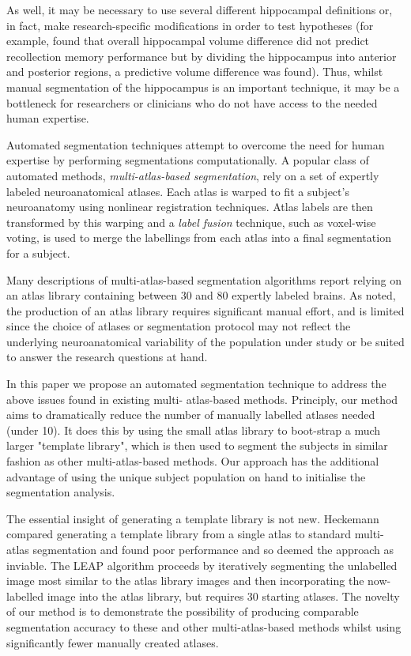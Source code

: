 \documentclass{article}
\begin{document}
As well, it may be necessary to use several different hippocampal
definitions or, in fact, make research-specific modifications in order to test
hypotheses (for example, \cite{Poppenk2011} found that overall hippocampal
volume difference did not predict recollection memory performance but by
dividing the hippocampus into anterior and posterior regions, a predictive
volume difference was found).  Thus, whilst manual segmentation of the
hippocampus is an important technique, it may be a bottleneck for researchers
or clinicians who do not have access to the needed human expertise.

Automated segmentation techniques attempt to overcome the need for human
expertise by performing segmentations computationally.  A popular class of
automated methods, {\it multi-atlas-based segmentation}, rely on a set of
expertly labeled neuroanatomical atlases. Each atlas is warped to fit a
subject's neuroanatomy using nonlinear registration
techniques\cite{Collins1995,Klein2009}.  Atlas labels are then transformed
by this warping and a {\it label fusion} technique, such as voxel-wise
voting, is used to merge the labellings from each atlas into a final
segmentation for a subject.  

Many descriptions of multi-atlas-based segmentation algorithms report relying on an
atlas library containing between 30 and 80 expertly labeled
brains\cite{Heckemann2011,Collins2010,Aljabar2009,Leung2010,Lotjonen2010}.
As noted, the production of an atlas library requires significant manual
effort, and is limited since the choice of atlases or segmentation protocol may
not reflect the underlying neuroanatomical variability of the population under
study or be suited to answer the research questions at hand.

In this paper we propose an automated segmentation technique to address the
above issues found in existing multi- atlas-based methods. Principly, our
method aims to dramatically reduce the number of manually labelled atlases
needed (under 10). It does this by using the small atlas library to boot-strap
a much larger "template library", which is then used to segment the subjects in
similar fashion as other multi-atlas-based methods. Our approach has the
additional advantage of using the unique subject population on hand to
initialise the segmentation analysis.

The essential insight of generating a template library is not new.  Heckemann
\cite{Heckemann2006} compared generating a template library from a single atlas
to standard multi-atlas segmentation and found poor performance and so deemed
the approach as inviable.  The LEAP algorithm \cite{Wolz2010} proceeds by
iteratively segmenting the unlabelled image most similar to the atlas library
images and then incorporating the now-labelled image into the atlas library,
but requires 30 starting atlases.  The novelty of our method is to demonstrate
the possibility of producing comparable segmentation accuracy to these and
other multi-atlas-based methods whilst using significantly fewer manually
created atlases.
\end{document}
